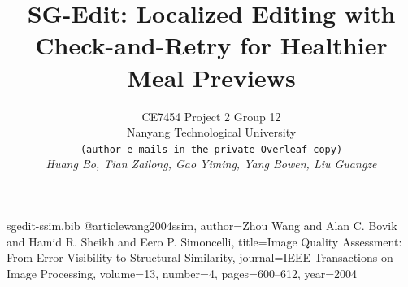 \begin{filecontents*}{sgedit-ssim.bib}
@article{wang2004ssim,
  author={Zhou Wang and Alan C. Bovik and Hamid R. Sheikh and Eero P. Simoncelli},
  title={Image Quality Assessment: From Error Visibility to Structural Similarity},
  journal={IEEE Transactions on Image Processing},
  volume={13}, number={4}, pages={600--612}, year={2004}
}
\end{filecontents*}
\documentclass[10pt,twocolumn,letterpaper]{article}
\usepackage[pagenumbers]{cvpr}

\usepackage{tikz}
\usetikzlibrary{arrows.meta}
\usepackage[breaklinks,colorlinks,allcolors=cvprblue]{hyperref}
\def\paperID{}
\def\confName{CVPR}
\def\confYear{2026}
\newcommand{\draftnote}[1]{\par\noindent{\color{blue}\small\textbf{Draft:} #1}\par}
\title{SG-Edit: Localized Editing with Check-and-Retry for Healthier Meal Previews}
\author{CE7454 Project 2 Group 12\\
Nanyang Technological University\\
{\small\texttt{(author e-mails in the private Overleaf copy)}}\\
\textit{Huang Bo, Tian Zailong, Gao Yiming, Yang Bowen, Liu Guangze}}

\maketitle
\begin{abstract}
Can an editor change one ingredient in a meal photograph while keeping the rest of the meal recognizable? We study localized ingredient editing for Singapore meal photographs, considering broccoli addition (Task~1) and white-to-brown rice replacement (Task~2) on 20 photographs comprising 34 edit requests. We compare whole-image generation with a localized diffusion editor, then test whether a vision-language checker can guide retries. On this retrospective cohort, the revised rice prompt increased single-shot checker acceptance from 0/14 to 10/14. A predetermined retry schedule passes 29/34 cases in 67 generations, compared with 28/34 in 68 for failure-conditioned retry. Four authors judged fewer adaptive outputs plausible than best-of-four outputs on both tasks. For first attempts, mean structural similarity outside the staple reaches 0.99997 with localization and 0.72455 with whole-image generation.
\end{abstract}

